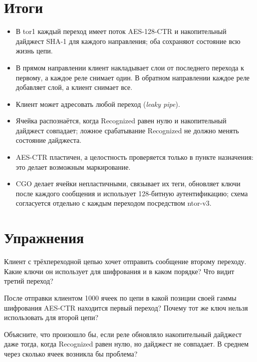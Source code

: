 \section*{Итоги}
\begin{itemize}
  \item В tor1 каждый переход имеет поток AES-128-CTR и накопительный дайджест SHA-1 для каждого направления; оба сохраняют состояние всю жизнь цепи.
  \item В прямом направлении клиент накладывает слои от последнего перехода к первому, а каждое реле снимает один. В обратном направлении каждое реле добавляет слой, а клиент снимает все.
  \item Клиент может адресовать любой переход (\emph{leaky pipe}).
  \item Ячейка распознаётся, когда Recognized равен нулю и накопительный дайджест совпадает; ложное срабатывание Recognized не должно менять состояние дайджеста.
  \item AES-CTR пластичен, а целостность проверяется только в пункте назначения: это делает возможным маркирование.
  \item CGO делает ячейки непластичными, связывает их теги, обновляет ключи после каждого сообщения и использует 128-битную аутентификацию; схема согласуется отдельно с каждым переходом посредством ntor-v3.
\end{itemize}

\section*{Упражнения}

\begin{esercizio}[1]\label{es:10-ordine}
Клиент с трёхпереходной цепью хочет отправить сообщение второму переходу. Какие ключи он использует для шифрования и в каком порядке? Что видит третий переход?
\end{esercizio}

\begin{esercizio}[1]\label{es:10-contatore}
После отправки клиентом 1000 ячеек по цепи в какой позиции своей гаммы шифрования AES-CTR находится первый переход? Почему тот же ключ нельзя использовать для второй цепи?
\end{esercizio}

\begin{esercizio}[2]\label{es:10-falso}
Объясните, что произошло бы, если реле обновляло накопительный дайджест даже тогда, когда Recognized равен нулю, но дайджест не совпадает. В среднем через сколько ячеек возникла бы проблема?
\end{esercizio}

